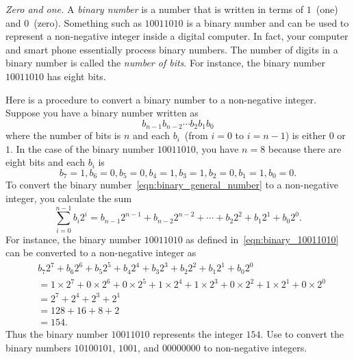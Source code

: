 \documentclass[a4paper,oneside,12pt]{article}
\begin{document}
\begin{problem}
\item\emph{Zero and one.}
  A \emph{binary number} is a number that is written in terms of
  $1$~(one) and $0$~(zero).  Something such as $10011010$ is a binary
  number and can be used to represent a non-negative integer inside a
  digital computer.  In fact, your computer and smart phone
  essentially process binary numbers.  The number of digits in a
  binary number is called the \emph{number of bits}.  For instance,
  the binary number $10011010$ has eight bits.
  \begin{packedenum}
  \item\label{subprob:binary_to_decimal}
    Here is a procedure to convert a binary number to a non-negative
    integer.  Suppose you have a binary number written as
    \begin{equation}
    \label{eqn:binary_general_number}
    b_{n-1} b_{n-2} \cdots b_2 b_1 b_0
    \end{equation}
    where the number of bits is $n$ and each $b_i$~(from $i = 0$ to
    $i = n - 1$) is either $0$ or $1$.  In the case of the binary
    number $10011010$, you have $n = 8$ because there are eight bits
    and each $b_i$ is
    \begin{equation}
    \label{eqn:binary_10011010}
    b_7 = 1\comma
    b_6 = 0\comma
    b_5 = 0\comma
    b_4 = 1\comma
    b_3 = 1\comma
    b_2 = 0\comma
    b_1 = 1\comma
    b_0 = 0.
    \end{equation}
    To convert the binary number~\eqref{eqn:binary_general_number} to
    a non-negative integer, you calculate the sum
    \begin{equation}
    \label{eqn:binary_to_decimal_formula}
    \sum_{i=0}^{n-1} b_i 2^i
    =
    b_{n-1} 2^{n-1} + b_{n-2} 2^{n-2} + \cdots
    + b_2 2^2 + b_1 2^1 + b_0 2^0.
    \end{equation}
    For instance, the binary number $10011010$ as defined
    in~\eqref{eqn:binary_10011010} can be converted to a non-negative
    integer as
    \begin{align*}
    &b_7 2^7 + b_6 2^6 + b_5 2^5 + b_4 2^4
      + b_3 2^3 + b_2 2^2 + b_1 2^1 + b_0 2^0 \\[4pt]
    &=
    1 \times 2^7 + 0 \times 2^6 + 0 \times 2^5 + 1 \times 2^4
    + 1 \times 2^3 + 0 \times 2^2 + 1 \times 2^1 + 0 \times 2^0 \\[4pt]
    &=
    2^7 + 2^4 + 2^3 + 2^1 \\[4pt]
    &=
    128 + 16 + 8 + 2 \\[4pt]
    &=
    154.
    \end{align*}
    Thus the binary number $10011010$ represents the integer $154$.
    Use  to convert the binary
    numbers $10100101$, $1001$, and $00000000$ to non-negative
    integers.


\end{packedenum}
\end{problem}
\end{document}
